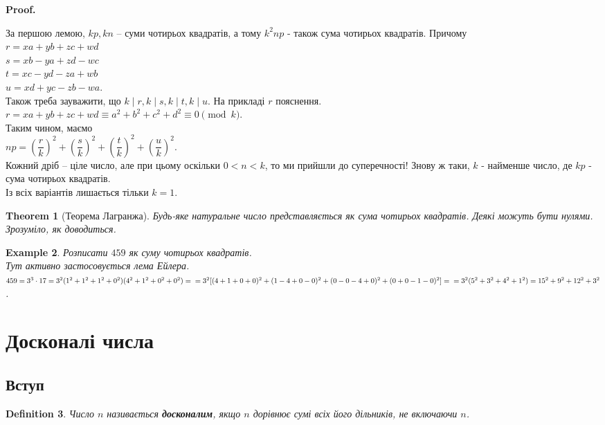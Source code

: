 \documentclass[a4paper, 14pt]{extarticle}
\makeatletter
\theoremstyle{theoremdd}
\newtheorem{theorem}{Theorem}[subsection]
\theoremstyle{theoremdd}
\newtheorem{definition}[theorem]{Definition}
\theoremstyle{theoremdd}
\theoremstyle{theoremdd}
\newtheorem{example}[theorem]{Example}
\theoremstyle{theoremdd}
\theoremstyle{theoremdd}
\theoremstyle{theoremdd}
\theoremstyle{theoremdd}
\def\qed{$\blacksquare$}
\renewenvironment{proof}[1][Proof.\\]{\par
\pushQED{\hfill \qed}%
\normalfont \topsep6\p@\@plus6\p@\relax
\trivlist
\item\relax
{\bfseries
#1\@addpunct{.}}\hspace\labelsep\ignorespaces
}{%
\popQED\endtrivlist\@endpefalse
}
\makeatother
\begin{document}
\begin{proof}
За першою лемою, $kp,kn$ -- суми чотирьох квадратів, а тому $k^2np$ - також сума чотирьох квадратів. Причому\\
$r = xa+yb+zc+wd$\\
$s = xb-ya+zd-wc$\\
$t = xc-yd-za+wb$\\
$u = xd+yc-zb-wa$.\\
Також треба зауважити, що $k \mid r,k \mid s,k \mid t,k \mid u$. На прикладі $r$ пояснення.\\
$r = xa+yb+zc+wd \equiv a^2+b^2+c^2+d^2 \equiv 0 \pmod k$.\\
Таким чином, маємо\\
$np = \left( \dfrac{r}{k} \right)^2 + \left( \dfrac{s}{k} \right)^2 + \left( \dfrac{t}{k} \right)^2 + \left( \dfrac{u}{k} \right)^2$.\\
Кожний дріб -- ціле число, але при цьому оскільки $0 < n < k$, то ми прийшли до суперечності! Знову ж таки, $k$ - найменше число, де $kp$ - сума чотирьох квадратів.\\
Із всіх варіантів лишається тільки $k = 1$.
\end{proof}

\begin{theorem}[Теорема Лагранжа]
Будь-яке натуральне число представляється як сума чотирьох квадратів. Деякі можуть бути нулями.\\
\textit{Зрозуміло, як доводиться.}
\end{theorem}

\begin{example}
Розписати $459$ як суму чотирьох квадратів.\\
Тут активно застосовується лема Ейлера.\\
$459 = 3^3 \cdot 17 = 3^2 (1^2+1^2+1^2+0^2)(4^2+1^2+0^2+0^2) = \\
= 3^2[(4+1+0+0)^2+(1-4+0-0)^2+(0-0-4+0)^2+(0+0-1-0)^2] = \\ = 3^2(5^2+3^2+4^2+1^2) = 15^2 + 9^2 + 12^2 + 3^2$.\\
\end{example}
\newpage

\section{Досконалі числа}
\subsection{Вступ}
\begin{definition}
Число $n$ називається \textbf{досконалим}, якщо $n$ дорівнює сумі всіх його дільників, не включаючи $n$.
\end{definition}
\end{document}
